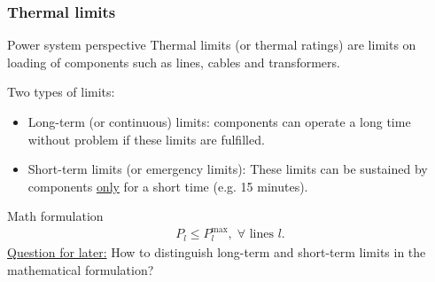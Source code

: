 \documentclass[compress]{beamer}
\begin{document}
\begin{frame}
\frametitle{Thermal limits}
\begin{block}{Power system perspective}
Thermal limits (or thermal ratings) are limits on loading of components such as lines, cables and transformers.

Two types of limits:
\begin{itemize}
\item Long-term (or continuous) limits: components can operate a long time without problem if these limits are fulfilled.
\item Short-term limits (or emergency limits): These limits can be sustained by components \underline{only} for a short time (e.g. 15 minutes).
\end{itemize}
\end{block}
\begin{block}{Math formulation}
  \begin{align*}
    P_{l} \leq P_l^{\text{max}}, \; \forall \text{ lines } l.
  \end{align*}
\footnotesize \underline{Question for later:} How to distinguish long-term and short-term limits in the mathematical formulation?
\end{block}
\end{frame}
\end{document}
